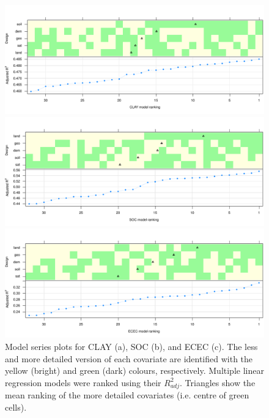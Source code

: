 \begin{figure}[!ht]
 \centering
 \begin{minipage}[b]{\textwidth}
  \subcaption{}
  \includegraphics[width=\textwidth]{fig/chap05FIG5a}
 \end{minipage}
 \begin{minipage}[b]{\textwidth}
  \subcaption{}
  \includegraphics[width=\textwidth]{fig/chap05FIG5b}
 \end{minipage}
 \begin{minipage}[b]{\textwidth}
  \subcaption{}
  \includegraphics[width=\textwidth]{fig/chap05FIG5c}
 \end{minipage}
 \caption{Model series plots for CLAY (a), SOC (b), and ECEC (c). The less and more detailed version of each 
 covariate are identified with the yellow (bright) and green (dark) colours, respectively. Multiple linear 
 regression models were ranked using their ${R}^{2}_{adj}$. Triangles show the mean ranking of the more 
 detailed covariates (i.e. centre of green cells).}
 \label{fig:chap05-model-series}
\end{figure}

